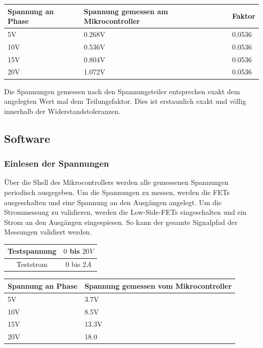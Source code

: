 \begin{center}
	\begin{tabular}{|l|l|l|}
		\hline 
		Spannung an Phase & Spannung gemessen am Mikrocontroller & Faktor\\ \hline
		5V & 0.268V & 0.0536\\ \hline
		10V & 0.536V & 0.0536\\ \hline
		15V & 0.804V & 0.0536\\ \hline
		20V & 1.072V & 0.0536\\ \hline
	\end{tabular} 
	\label{tab:spannteiler}
\end{center}

Die Spannungen gemessen nach den Spannungsteiler entsprechen exakt dem angelegten Wert mal dem Teilungsfaktor. Dies ist erstaunlich exakt und völlig innerhalb der Widerstandstoleranzen.

\subsection*{Software}
\subsubsection*{Einlesen der Spannungen}
Über die Shell des Mikrocontrollers werden alle gemessenen Spannungen periodisch ausgegeben. Um die Spannungen zu messen, werden die FETs ausgeschalten und eine Spannung an den Ausgängen angelegt. Um die Strommessung zu validieren, werden die Low-Side-FETs eingeschalten und ein Strom an den Ausgängen eingespiesen. So kann der gesamte Signalpfad der Messungen validiert werden.

\begin{center}
	\begin{tabular}{|c|c|}
		\hline 
		Testspannung & $0$ bis $20V$ \\ \hline
		Teststrom & $0$ bis $2A$ \\ \hline
	\end{tabular} 
	\label{tab:swvmessbed}
\end{center}

\begin{center}
	\begin{tabular}{|l|l|}
		\hline 
		Spannung an Phase & Spannung gemessen vom Mikrocontroller \\ \hline
		5V & 3.7V\\ \hline
		10V & 8.5V\\ \hline
		15V & 13.3V\\ \hline
		20V & 18.0\\ \hline
	\end{tabular} 
	\label{tab:spannsw}
\end{center}

